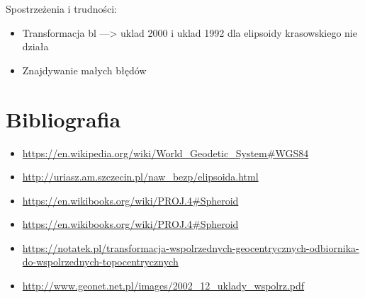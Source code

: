 \documentclass[11pt, a4paper]{article}
\begin{document}
	Spostrzeżenia i trudności:
	\begin{itemize}
		\item Transformacja bl ---> uklad 2000 i uklad 1992 dla elipsoidy krasowskiego nie działa
		\item Znajdywanie małych błędów
		
	\end{itemize}
	\newpage
	\section{Bibliografia}
	
	\begin{itemize}
		\item \url{https://en.wikipedia.org/wiki/World_Geodetic_System#WGS84}
		\item \url{http://uriasz.am.szczecin.pl/naw_bezp/elipsoida.html}
		\item \url{https://en.wikibooks.org/wiki/PROJ.4#Spheroid}
		\item \url{https://en.wikibooks.org/wiki/PROJ.4#Spheroid}
		\item \url{https://notatek.pl/transformacja-wspolrzednych-geocentrycznych-odbiornika-do-wspolrzednych-topocentrycznych}
		\item \url{http://www.geonet.net.pl/images/2002_12_uklady_wspolrz.pdf}
	\end{itemize}
	
	
\end{document}
